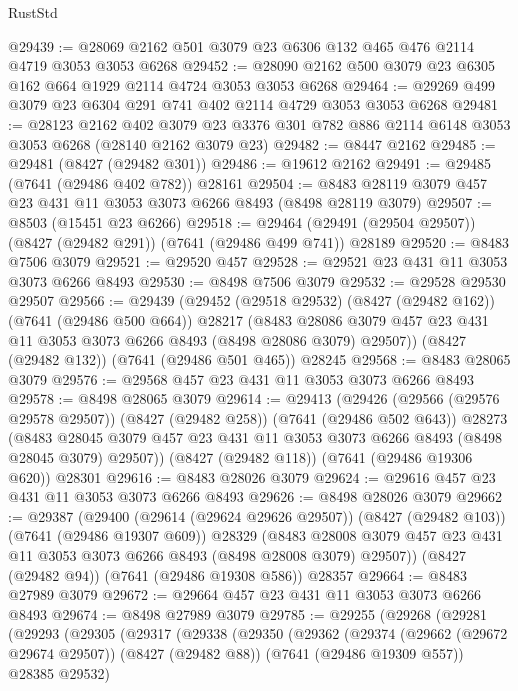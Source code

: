 \begin{lexlean}{RustStd}
\begin{coremodule}
{\begin{coremodule}
{{{{{{{{{{{{{{{{{{{{{{{{{{{{{{{{@29439 := @28069 @2162 @501 @3079 @23 @6306 @132 @465 @476 @2114 @4719 @3053 @3053 @6268
@29452 := @28090 @2162 @500 @3079 @23 @6305 @162 @664 @1929 @2114 @4724 @3053 @3053 @6268
@29464 := @29269 @499 @3079 @23 @6304 @291 @741 @402 @2114 @4729 @3053 @3053 @6268
@29481 := @28123
    @2162
    @402
    @3079
    @23
    @3376
    @301
    @782
    @886
    @2114
    @6148
    @3053
    @3053
    @6268
    (@28140 @2162 @3079 @23)
@29482 := @8447 @2162
@29485 := @29481 (@8427 (@29482 @301))
@29486 := @19612 @2162
@29491 := @29485 (@7641 (@29486 @402 @782)) @28161
@29504 := @8483 @28119 @3079 @457 @23 @431 @11 @3053 @3073 @6266 @8493 (@8498 @28119 @3079)
@29507 := @8503 (@15451 @23 @6266)
@29518 := @29464 (@29491 (@29504 @29507)) (@8427 (@29482 @291)) (@7641 (@29486 @499 @741)) @28189
@29520 := @8483 @7506 @3079
@29521 := @29520 @457
@29528 := @29521 @23 @431 @11 @3053 @3073 @6266 @8493
@29530 := @8498 @7506 @3079
@29532 := @29528 @29530 @29507
@29566 := @29439
    (@29452
      (@29518 @29532)
      (@8427 (@29482 @162))
      (@7641 (@29486 @500 @664))
      @28217
      (@8483 @28086 @3079 @457 @23 @431 @11 @3053 @3073 @6266 @8493 (@8498 @28086 @3079) @29507))
    (@8427 (@29482 @132))
    (@7641 (@29486 @501 @465))
    @28245
@29568 := @8483 @28065 @3079
@29576 := @29568 @457 @23 @431 @11 @3053 @3073 @6266 @8493
@29578 := @8498 @28065 @3079
@29614 := @29413
    (@29426
      (@29566 (@29576 @29578 @29507))
      (@8427 (@29482 @258))
      (@7641 (@29486 @502 @643))
      @28273
      (@8483 @28045 @3079 @457 @23 @431 @11 @3053 @3073 @6266 @8493 (@8498 @28045 @3079) @29507))
    (@8427 (@29482 @118))
    (@7641 (@29486 @19306 @620))
    @28301
@29616 := @8483 @28026 @3079
@29624 := @29616 @457 @23 @431 @11 @3053 @3073 @6266 @8493
@29626 := @8498 @28026 @3079
@29662 := @29387
    (@29400
      (@29614 (@29624 @29626 @29507))
      (@8427 (@29482 @103))
      (@7641 (@29486 @19307 @609))
      @28329
      (@8483 @28008 @3079 @457 @23 @431 @11 @3053 @3073 @6266 @8493 (@8498 @28008 @3079) @29507))
    (@8427 (@29482 @94))
    (@7641 (@29486 @19308 @586))
    @28357
@29664 := @8483 @27989 @3079
@29672 := @29664 @457 @23 @431 @11 @3053 @3073 @6266 @8493
@29674 := @8498 @27989 @3079
@29785 := @29255
    (@29268
      (@29281
        (@29293
          (@29305
            (@29317
              (@29338
                (@29350
                  (@29362
                    (@29374
                      (@29662 (@29672 @29674 @29507))
                      (@8427 (@29482 @88))
                      (@7641 (@29486 @19309 @557))
                      @28385
                      @29532)
}}}}}}}}}}}}}}}}}}}}}}}}}}}}}}}}
\end{coremodule}}
\end{coremodule}
\end{lexlean}
